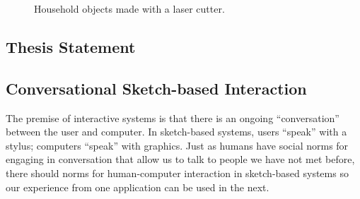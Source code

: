 \documentclass[12pt]{article}
\begin{document}
\begin{figure}
\centering 
{}
\hspace{1cm} 
\caption{Household objects made with a laser cutter.}
\label{fig:flat}
\end{figure}

\subsection{Thesis Statement}


\subsection{Conversational Sketch-based Interaction}

The premise of interactive systems is that there is an ongoing
``conversation'' between the user and computer. In sketch-based
systems, users ``speak'' with a stylus; computers ``speak'' with
graphics. Just as humans have social norms for engaging in
conversation that allow us to talk to people we have not met before,
there should norms for human-computer interaction in sketch-based
systems so our experience from one application can be used in the
next.
\end{document}
